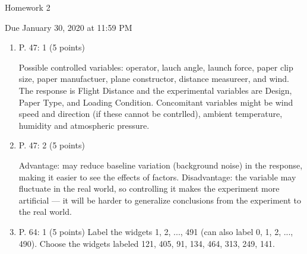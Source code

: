 \documentclass{article}
\begin{document}
\begin{center} \LARGE
Homework 2 
\end{center}
\begin{center} \Large
Due January 30, 2020 at 11:59 PM 
\end{center}



\begin{enumerate}
	\item P. 47: 1 (5 points)

		{\color{red} 
		Possible controlled variables: operator, lauch angle, launch
	force, paper clip size, paper manufactuer, plane constructor,
distance measureer, and wind. The response is Flight Distance and the
experimental variables are Design, Paper Type, and Loading Condition.
Concomitant variables might be wind speed and direction (if these cannot be
contrlled), ambient temperature, humidity and atmospheric pressure.}
	\item P. 47: 2 (5 points)

		{\color{red}
			Advantage: may reduce baseline variation (background
			noise) in the response, making it easier to see the
			effects of factors. Disadvantage: the variable may
			fluctuate in the real world, so controlling it makes
			the experiment more artificial --- it will be harder
			to generalize conclusions from the experiment to the
			real world.
		}

	\item P. 64: 1 (5 points)
		{\color{red}
			Label the widgets 1, 2, ..., 491 (can also label 0, 1,
			2, ..., 490). Choose the widgets
			labeled 121, 405, 91, 134, 464, 313, 249, 141. 
		}


\end{enumerate}
\end{document}
